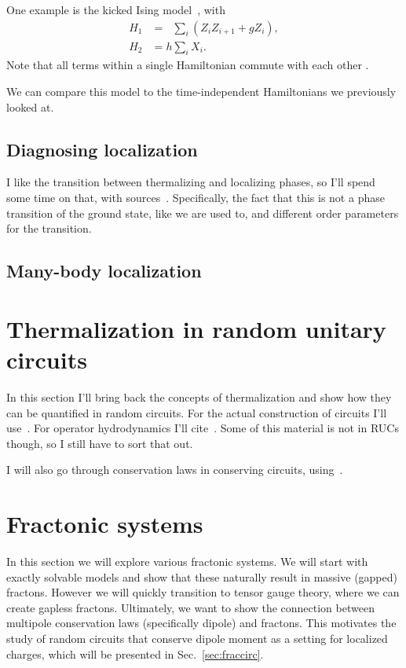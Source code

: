 \documentclass[a4paper,12pt]{article}
\newcommand{\nn}{\nonumber\\}
\newcommand{\note}[1]{{\color{red}{#1}}}
\begin{document}
One example is the kicked Ising model~\cite{vonKeyserlingkHydro}, with 
\begin{align}
H_1 &= \phantom{h}\sum_i\left(Z_iZ_{i+1}+gZ_i\right),\nn
H_2 &= h\sum_iX_i.
\end{align}
Note that all terms within a single Hamiltonian commute with each other \note{why does this matter?}.

We can compare this model to the time-independent Hamiltonians we previously looked at.

\subsection{Diagnosing localization} \label{sub:local}

I like the transition between thermalizing and localizing phases, so I'll spend some time on that, with sources~\cite{PalHuse, KhemaniCP}. Specifically, the fact that this is not a phase transition of the ground state, like we are used to, and different order parameters for the transition. 

\subsection{Many-body localization} \label{sub:mbl}


\section{Thermalization in random unitary circuits} \label{sec:ruc}

In this section I'll bring back the concepts of thermalization and show how they can be quantified in random circuits. For the actual construction of circuits I'll use~\cite{NahumRuhmanHuse, NahumEntanglement}.
For operator hydrodynamics I'll cite~\cite{NahumOpSp, vonKeyserlingkHydro, KhemaniLambda, KhemaniOpSp, JonayEntanglement}. Some of this material is not in RUCs though, so I still have to sort that out.

I will also go through conservation laws in conserving circuits, using~\cite{RakovskyDiff, HuangRenyi}.


\section{Fractonic systems} \label{sec:frac}

In this section we will explore various fractonic systems. We will start with exactly solvable models and show that these naturally result in massive (gapped) fractons. However we will quickly transition to tensor gauge theory, where we can create gapless fractons. Ultimately, we want to show the connection between multipole conservation laws (specifically dipole) and fractons. This motivates the study of random circuits that conserve dipole moment as a setting for localized charges, which will be presented in Sec.~\ref{sec:fraccirc}.
\end{document}
